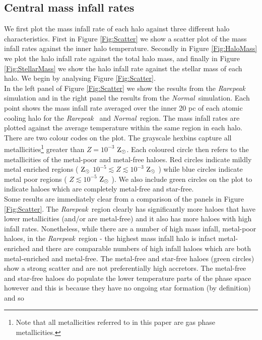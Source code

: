 \documentclass[graphics, twocolumn, usenatbib]{mn2e}
\newcommand{\zsolar} {$\rm{Z_{\odot}}~$}
\newcommand{\zsolarc} {$\rm{Z_{\odot}}$}
\newcommand{\rarepeak} {\textit{Rarepeak~}}
\newcommand{\normal} {\textit{Normal~}}
\begin{document}
\subsection{Central mass infall rates}
\indent We first plot the mass infall rate of each halo against three different halo
characteristics. First in Figure \ref{Fig:Scatter} we show a scatter plot of the mass infall rates
against the inner halo temperature. Secondly in Figure \ref{Fig:HaloMass} we plot the halo infall
rate against the total halo mass, and finally in Figure  \ref{Fig:StellarMass} we show the halo
infall rate against the stellar mass of each halo. We begin by analysing Figure \ref{Fig:Scatter}. \\
\indent In the left panel of Figure \ref{Fig:Scatter} we show the results from the \rarepeak
simulation and in the right panel the results from the \normal simulation. Each point shows the mass
infall rate averaged over the inner 20 pc of each atomic cooling halo for the \rarepeak
and \normal region. The mass infall rates are plotted against the average temperature within
the same region in each halo. There are two colour codes on the plot. The grayscale
hexbins capture all metallicities\footnote{Note that all metallicities
  referred to in this paper are gas phase metallicities.}
greater than $Z = 10^{-3}$ \zsolarc. Each coloured circle then refers to
the metallicities of the metal-poor and metal-free haloes. Red circles indicate
mildly metal enriched regions ( \zsolar $10^{-5} \lesssim Z \lesssim 10^{-3}$ \zsolar )
while blue circles indicate metal poor regions  ( $Z \lesssim 10^{-5}$ \zsolar ). We also
include green circles on the plot to indicate haloes which are completely metal-free and star-free. \\
\indent Some results are immediately clear from a comparison of the panels in Figure
\ref{Fig:Scatter}. The \rarepeak region clearly has significantly more haloes that have lower
metallicities (and/or are metal-free) and it also has more haloes
with high infall rates. Nonetheless, while there are a number of high mass infall,
metal-poor haloes, in the \rarepeak region - the highest mass infall halo is infact metal-enriched
and there are comparable numbers of high infall haloes which are both metal-enriched and metal-free.
The metal-free and star-free haloes (green circles) show a strong scatter and are not preferentially
high accretors. The metal-free and star-free haloes do populate the lower temperature parts of the
phase space however and this is because they have no ongoing star formation (by definition) and so
\end{document}
